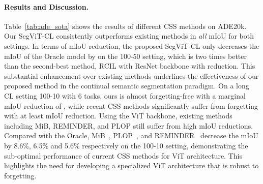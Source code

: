 \begin{table}[t]
\centering
\caption{Performance drop (degree of forgetting) of all classes grouped by tasks on the 100-10 setting. We report the class mIoU when the model first learns the task, and the mIoU when the model last learns it.}
\label{tab:task_drop}
\end{table}



\paragraph{Results and Discussion.}
Table~\ref{tab:ade_sota} shows the results of different CSS methods on ADE20k. Our SegViT-CL consistently outperforms existing methods in \emph{all} mIoU for both settings. In terms of mIoU reduction, the proposed SegViT-CL only decreases the mIoU of the Oracle model by  on the 100-50 setting, which is two times better than the second-best method, RCIL with ResNet backbone with  reduction. This substantial enhancement over existing methods underlines the effectiveness of our proposed method in the continual semantic segmentation paradigm. On a long CL setting 100-10 with 6 tasks, ours is almost forgetting-free with a marginal mIoU reduction of , while recent CSS methods significantly suffer from forgetting with at least  mIoU reduction. Using the ViT backbone, existing methods including MiB, REMINDER, and PLOP still suffer from high mIoU reductions. Compared with the Oracle, MiB~\cite{cermelli2020ModelingTB}, PLOP~\cite{douillard2021PLOPLW}, and REMINDER~\cite{phan2022class} decrease the mIoU by 8.6\%, 6.5\% and 5.6\% respectively on the 100-10 setting, demonstrating the sub-optimal performance of current CSS methods for ViT architecture. This highlights the need for developing a specialized ViT architecture that is robust to forgetting.

